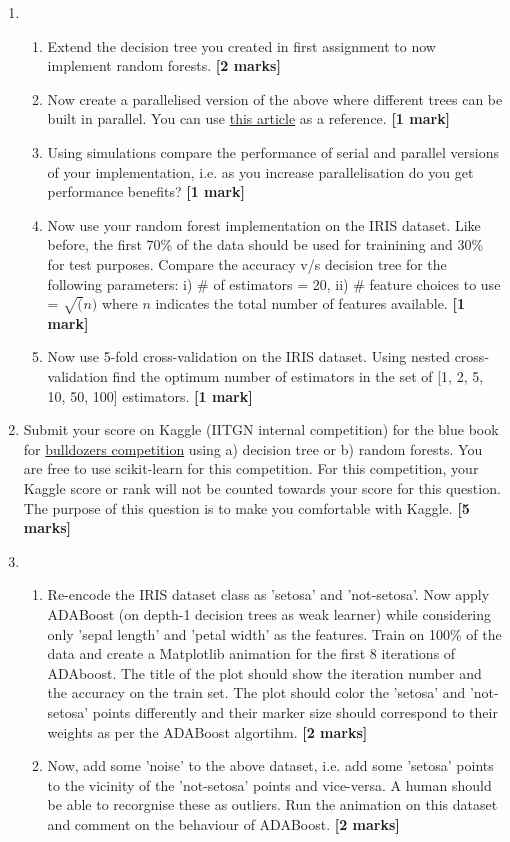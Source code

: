 \documentclass[colorlinks]{article}
\begin{document}
\begin{enumerate}



	 \item \begin{enumerate}
	 	\item Extend the decision tree you created in first assignment to now implement random forests.  \textbf{[2 marks]}
	 	\item Now create a parallelised version of the above where different trees can be built in parallel. You can use \href{https://sebastianraschka.com/Articles/2014_multiprocessing.html}{this article} as a reference. \textbf{[1 mark]}
	 	\item Using simulations compare the performance of serial and parallel versions of your implementation, i.e. as you increase parallelisation do you get performance benefits? \textbf{[1 mark]}
	 	\item Now use your random forest implementation on the IRIS dataset. Like before, the first 70\% of the data should be used for trainining and 30\% for test purposes. Compare the accuracy v/s decision tree for the following parameters: i) \# of estimators = 20, ii) \# feature choices to use = $\sqrt(n)$ where $n$ indicates the total number of features available.  \textbf{[1 mark]}
	 	\item Now use 5-fold cross-validation on the IRIS dataset. Using nested cross-validation find the optimum number of estimators in the set of [1, 2, 5, 10, 50, 100] estimators.  \textbf{[1 mark]}
	 \end{enumerate}
 
	\item Submit your score on Kaggle (IITGN internal competition) for the blue book for \href{https://www.kaggle.com/c/iitgnml/}{bulldozers competition} using a) decision tree or b) random forests. You are free to use scikit-learn for this competition. For this competition, your Kaggle score or rank will not be counted towards your score for this question. The purpose of this question is to make you comfortable with Kaggle.
\textbf{[5 marks]}

\item \begin{enumerate}
	\item Re-encode the IRIS dataset class as 'setosa' and 'not-setosa'. Now apply ADABoost (on depth-1 decision trees as weak learner) while considering only 'sepal length' and 'petal width' as the features. Train on 100\% of the data and create a Matplotlib animation for the first 8 iterations of ADAboost. The title of the plot should show the iteration number and the accuracy on the train set. The plot should color the 'setosa' and 'not-setosa' points differently and their marker size should correspond to their weights as per the ADABoost algortihm. \textbf{[2 marks]}
	\item Now, add some 'noise' to the above dataset, i.e. add some 'setosa' points to the vicinity of the 'not-setosa' points and vice-versa. A human should be able to recorgnise these as outliers. Run the animation on this dataset and comment on the behaviour of ADABoost. \textbf{[2 marks]}
\end{enumerate}



\end{enumerate}
\end{document}
